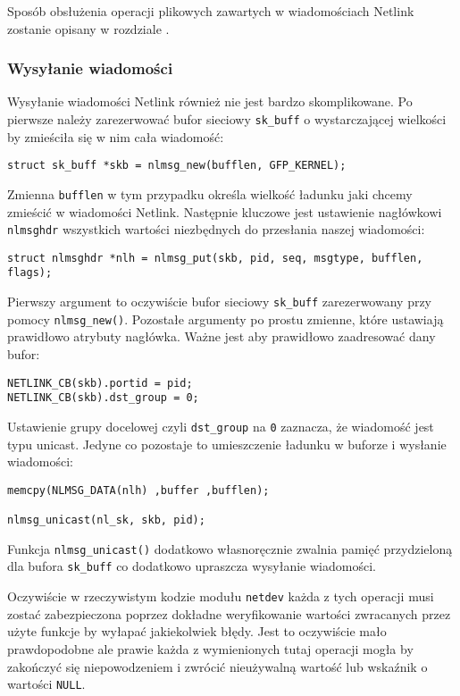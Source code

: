 \documentclass[10pt]{article}
\begin{document}
Sposób obsłużenia operacji plikowych zawartych w wiadomościach Netlink zostanie opisany w rozdziale .

\subsubsection{Wysyłanie wiadomości}
\label{msgsend}

Wysyłanie wiadomości Netlink również nie jest bardzo skomplikowane. Po pierwsze należy zarezerwować bufor sieciowy \texttt{sk\_buff} o wystarczającej wielkości by zmieściła się w nim cała wiadomość:

\begin{verbatim}
struct sk_buff *skb = nlmsg_new(bufflen, GFP_KERNEL);
\end{verbatim}

Zmienna \texttt{bufflen} w tym przypadku określa wielkość ładunku jaki chcemy zmieścić w wiadomości Netlink. Następnie kluczowe jest ustawienie nagłówkowi \texttt{nlmsghdr} wszystkich wartości niezbędnych do przesłania naszej wiadomości:

\begin{verbatim}
struct nlmsghdr *nlh = nlmsg_put(skb, pid, seq, msgtype, bufflen, flags);
\end{verbatim}

Pierwszy argument to oczywiście bufor sieciowy \texttt{sk\_buff} zarezerwowany przy pomocy \texttt{nlmsg\_new()}. Pozostałe argumenty po prostu zmienne, które ustawiają prawidłowo atrybuty nagłówka. Ważne jest aby prawidłowo zaadresować dany bufor:

\begin{verbatim}
NETLINK_CB(skb).portid = pid;
NETLINK_CB(skb).dst_group = 0;
\end{verbatim}

Ustawienie grupy docelowej czyli \texttt{dst\_group} na \texttt{0} zaznacza, że wiadomość jest typu unicast. Jedyne co pozostaje to umieszczenie ładunku w buforze i wysłanie wiadomości:

\begin{verbatim}
memcpy(NLMSG_DATA(nlh) ,buffer ,bufflen);

nlmsg_unicast(nl_sk, skb, pid);
\end{verbatim}

Funkcja \texttt{nlmsg\_unicast()} dodatkowo własnoręcznie zwalnia pamięć przydzieloną dla bufora \texttt{sk\_buff} co dodatkowo upraszcza wysyłanie wiadomości.

Oczywiście w rzeczywistym kodzie modułu \texttt{netdev} każda z tych operacji musi zostać zabezpieczona poprzez dokładne weryfikowanie wartości zwracanych przez użyte funkcje by wyłapać jakiekolwiek błędy.  Jest to oczywiście mało prawdopodobne ale prawie każda z wymienionych tutaj operacji mogła by zakończyć się niepowodzeniem i zwrócić nieużywalną wartość lub wskaźnik o wartości \texttt{NULL}.
\end{document}

